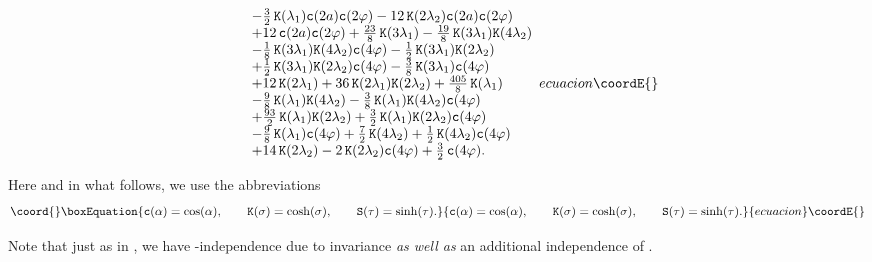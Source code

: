\documentclass[a4paper,12pt]{article}
\begin{document}
\begin{equation}
{\begin{array}{lll}
&&-\frac{3}{2}\,\coshx{ \lambda_1} \cosx{2 a} \cosx{2 \varphi}
-12\,\coshx{2 \lambda_2} \cosx{2 a} \cosx{2 \varphi}\\
&&+12\,\cosx{2 a} \cosx{2 \varphi}
+\frac{23}{8}\,\coshx{3 \lambda_1}
-\frac{19}{8}\,\coshx{3 \lambda_1} \coshx{4 \lambda_2}\\
&&-\frac{1}{8}\,\coshx{3 \lambda_1} \coshx{4 \lambda_2} \cosx{4 \varphi}
-\frac{1}{2}\,\coshx{3 \lambda_1} \coshx{2 \lambda_2}\\
&&+\frac{1}{2}\,\coshx{3 \lambda_1} \coshx{2 \lambda_2} \cosx{4 \varphi}
-\frac{3}{8}\,\coshx{3 \lambda_1} \cosx{4 \varphi}\\
&&+12\,\coshx{2 \lambda_1}
+36\,\coshx{2 \lambda_1} \coshx{2 \lambda_2}
+\frac{405}{8}\,\coshx{ \lambda_1}\\
&&-\frac{9}{8}\,\coshx{ \lambda_1} \coshx{4 \lambda_2}
-\frac{3}{8}\,\coshx{ \lambda_1} \coshx{4 \lambda_2} \cosx{4 \varphi}\\
&&+\frac{93}{2}\,\coshx{ \lambda_1} \coshx{2 \lambda_2}
+\frac{3}{2}\,\coshx{ \lambda_1} \coshx{2 \lambda_2} \cosx{4 \varphi}\\
&&-\frac{9}{8}\,\coshx{ \lambda_1} \cosx{4 \varphi}
+\frac{7}{2}\,\coshx{4 \lambda_2}
+\frac{1}{2}\,\coshx{4 \lambda_2} \cosx{4 \varphi}\\
&&+14\,\coshx{2 \lambda_2}
-2\,\coshx{2 \lambda_2} \cosx{4 \varphi}
+\frac{3}{2}\,\cosx{4 \varphi}.
\end{array}
}{ecuacion}\coordE{}\end{equation}

Here and in what follows, we use the abbreviations
\begin{equation}\coord{}\boxEquation{
\cosx{\alpha}=\cos(\alpha),\qquad \coshx{\sigma}=\cosh(\sigma),\qquad \sinhx{\tau}=\sinh(\tau).
}{
\cosx{\alpha}=\cos(\alpha),\qquad \coshx{\sigma}=\cosh(\sigma),\qquad \sinhx{\tau}=\sinh(\tau).
}{ecuacion}\coordE{}\end{equation}

Note that just as in \cite{Warner:vz}, we have
\myHighlight{$\vartheta$}\coordHE{}-independence due to \coordHE{} invariance {\em as well as} an
additional independence of \myHighlight{$\Psi$}\coordHE{}.
\end{document}
